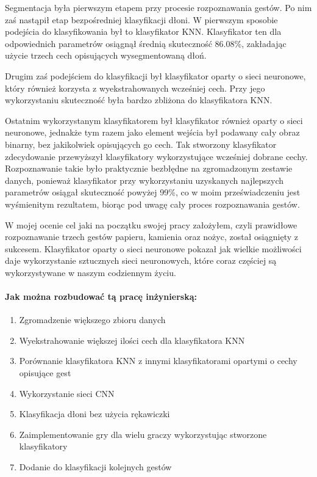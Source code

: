 \documentclass[a4paper,12pt,twoside,openany]{report}
\begin{document}
	Segmentacja była pierwszym etapem przy procesie rozpoznawania gestów. Po nim zaś nastąpił etap bezpośredniej klasyfikacji dłoni. W pierwszym sposobie podejścia do klasyfikowania był to klasyfikator KNN. Klasyfikator ten dla odpowiednich parametrów osiągnął średnią skuteczność 86.08\%, zakładając użycie trzech cech opisujących wysegmentowaną dłoń. 
	
	Drugim zaś podejściem do klasyfikacji był klasyfikator oparty o sieci neuronowe, który również korzysta z wyekstrahowanych wcześniej cech. Przy jego wykorzystaniu skuteczność była bardzo zbliżona do klasyfikatora KNN.
	
	 Ostatnim wykorzystanym klasyfikatorem był klasyfikator również oparty o sieci neuronowe, jednakże tym razem jako element wejścia był podawany cały obraz binarny, bez jakikolwiek opisujących go cech. Tak stworzony klasyfikator zdecydowanie przewyższył klasyfikatory wykorzystujące wcześniej dobrane cechy. Rozpoznawanie takie było praktycznie bezbłędne na zgromadzonym zestawie danych, ponieważ klasyfikator przy wykorzystaniu uzyskanych najlepszych parametrów osiągał skuteczność powyżej 99\%, co w moim przeświadczeniu jest wyśmienitym rezultatem, biorąc pod uwagę cały proces rozpoznawania gestów.
	
	W mojej ocenie cel jaki na początku swojej  pracy założyłem, czyli prawidłowe rozpoznawanie trzech gestów papieru, kamienia oraz nożyc, został osiągnięty z sukcesem. Klasyfikator oparty o sieci neuronowe pokazał jak  wielkie możliwości daje wykorzystanie sztucznych sieci neuronowych, które coraz częściej są wykorzystywane w naszym codziennym życiu.
	
	\paragraph{Jak można rozbudować tą pracę inżynierską: }
	\begin{enumerate}
		\item Zgromadzenie większego zbioru danych 
		\item Wyekstrahowanie większej ilości cech dla klasyfikatora KNN 
		\item Porównanie klasyfikatora KNN z innymi klasyfikatorami opartymi o cechy opisujące gest
		\item Wykorzystanie sieci CNN
		\item Klasyfikacja dłoni bez użycia rękawiczki
		\item Zaimplementowanie gry dla wielu graczy wykorzystując stworzone klasyfikatory
		\item Dodanie do klasyfikacji kolejnych gestów
	\end{enumerate}
	
\end{document}
